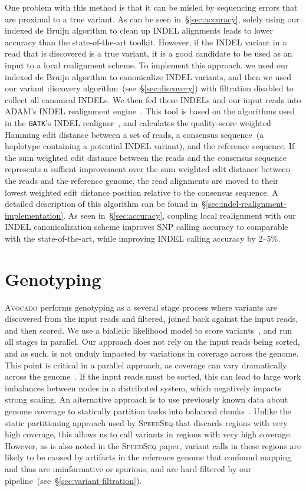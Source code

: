 \documentclass[phd]{ucbthesis}
\begin{document}
One problem with this method is that it can be misled by sequencing errors
that are proximal to a true variant. As can be seen in~\S\ref{sec:accuracy},
solely using our indexed de Bruijn algorithm to clean up INDEL alignments leads
to lower accuracy than the state-of-the-art toolkit. However, if the INDEL
variant in a read that is discovered is a true variant, it is a good candidate
to be used as an input to a local realignment scheme.  To implement this
approach, we used our indexed de Bruijn algorithm to canonicalize INDEL variants,
and then we used our variant discovery algorithm~(see~\S\ref{sec:discovery})
with filtration disabled to collect all canonical INDELs. We then fed these
INDELs and our input reads into \textsc{ADAM}'s INDEL realignment
engine~\cite{massie13, nothaft15}. This tool is based on the algorithms used in
the \texttt{GATK}'s INDEL realigner~\cite{depristo11}, and calculates the quality-score
weighted Hamming edit distance between a set of reads, a consensus sequence~(a
haplotype containing a potential INDEL variant), and the reference sequence. If
the sum weighted edit distance between the reads and the consensus sequence
represents a suffient improvement over the sum weighted edit distance between
the reads and the reference genome, the read alignments are moved to their
lowest weighted edit distance position relative to the consensus sequence.
A detailed description of this algorithm can be found in~\S\ref{sec:indel-realignment-implementation}.
As seen in~\S\ref{sec:accuracy}, coupling local realignment with our INDEL
canonicalization scheme improves SNP calling accuracy to comparable with the
state-of-the-art, while improving INDEL calling accuracy by 2--5\%.

\section{Genotyping}
\label{sec:genotyping}

\textsc{Avocado} performs genotyping as a several stage process where variants
are discovered from the input reads and filtered, joined back against the input
reads, and then scored. We use a biallelic likelihood model to score
variants~\cite{li11}, and run all stages in parallel. Our approach does not
rely on the input reads being sorted, and as such, is not unduly impacted by
variations in coverage across the genome. This point is critical in a parallel
approach, as coverage can vary dramatically across the genome~\cite{pinard06}.
If the input reads must be sorted, this can lead to large work imbalances
between nodes in a distributed system, which negatively impacts strong scaling.
An alternative approach is to use previously known data about genome coverage
to statically partition tasks into balanced chunks~\cite{chiang15}. Unlike the
static partitioning approach used by \textsc{SpeedSeq} that discards regions with
very high coverage, this allows us to call variants in regions with very high
coverage. However, as is also noted in the \textsc{SpeedSeq} paper, variant calls
in these regions are likely to be caused by artifacts in the reference genome that
confound mapping and thus are uninformative or spurious, and are hard filtered by
our pipeline~(see~\S\ref{sec:variant-filtration}).
\end{document}
